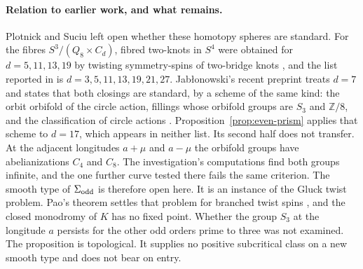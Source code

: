\paragraph{Relation to earlier work, and what remains.}
Plotnick and Suciu left open whether these homotopy spheres are
standard. For the fibres \(S^3/(Q_8\times C_d)\), fibred two-knots in
\(S^4\) were obtained for \(d=5,11,13,19\) by twisting symmetry-spins of
two-bridge knots \cite{Teragaito1989Twisting}, and the list reported in
\cite{Jablonowski2026Prism} is \(d=3,5,11,13,19,21,27\).
Jab\l{}onowski's recent preprint treats \(d=7\) and states that both
closings are standard, by a scheme of the same kind: the orbit orbifold
of the circle action, fillings whose orbifold groups are \(S_3\) and
\(\mathbb Z/8\), and the classification of circle actions
\cite{Jablonowski2026Prism}. Proposition~\ref{prop:even-prism} applies
that scheme to \(d=17\), which appears in neither list. Its second half
does not transfer. At the adjacent longitudes \(a+\mu\) and \(a-\mu\)
the orbifold groups have abelianizations \(C_4\) and \(C_8\). The
investigation's computations find both groups infinite, and the one
further curve tested there fails the same criterion. The smooth type of
\(\Sigma_{\rm odd}\) is therefore open here. It is an instance of the
Gluck twist problem. Pao's theorem settles that problem for branched
twist spins \cite{Pao1978Nonlinear,Fukuda2018Gluck}, and the closed
monodromy of \(K\) has no fixed point. Whether the group \(S_3\) at the
longitude \(a\) persists for the other odd orders prime to three was not
examined. The proposition is topological. It supplies no positive
subcritical class on a new smooth type and does not bear on entry.
